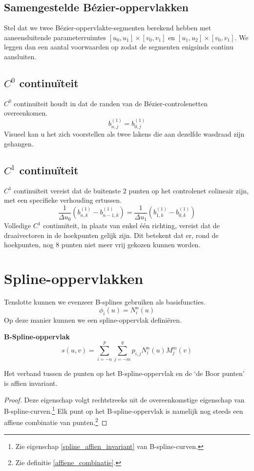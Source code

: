 \documentclass[computergesteund_ontwerp_van_curven_en_oppervlakken.tex]{subfiles}
\begin{document}
\subsection{Samengestelde B\'ezier-oppervlakken}
Stel dat we twee B\'ezier-oppervlakte-segmenten berekend hebben met aaneensluitende parameterruimtes $[u_0,u_1]\times[v_0,v_1]$ en $[u_1,u_2]\times[v_0,v_1]$. We leggen dan een aantal voorwaarden op zodat de segmenten enigsinds continu aansluiten.

\subsection*{$C^{0}$ continu\"iteit}
$C^{0}$ continu\"iteit houdt in dat de randen van de B\'ezier-controlenetten overeenkomen.
\[
b_{n,j}^{(1)} = b_{0,j}^{(1)}
\]
Visueel kan u het zich voorstellen als twee lakens die aan dezelfde wasdraad zijn gehangen.

\subsection*{$C^{1}$ continu\"iteit}
$C^{1}$ continu\"iteit vereist dat de buitenste $2$ punten op het controlenet colineair zijn, met een specifieke verhouding ertussen.
\[
\frac{1}{\Delta u_0}(b_{n,k}^{(1)}-b_{n-1,k}^{(1)}) = \frac{1}{\Delta u_1}(b_{1,k}^{(1)}-b_{0,k}^{(1)})
\]
Volledige $C^{1}$ continu\"iteit, in plaats van enkel \'e\'en richting, vereist dat de draaivectoren in de hoekpunten gelijk zijn. Dit betekent dat er, rond de hoekpunten, nog $8$ punten niet meer vrij gekozen kunnen worden.


\section{Spline-oppervlakken}
Tenslotte kunnen we evenzeer B-splines gebruiken als basisfuncties.
\[
\phi_{i}(u) = N_{i}^{n}(u)
\]
Op deze manier kunnen we een spline-oppervlak defini\"eren.
\begin{de}
\textbf{B-Spline-oppervlak}
\[
s(u,v) = \sum_{i=-n}^{p}\sum_{j=-m}^{q}p_{i,j}N_{i}^{n}(u)M_{j}^{m}(v)
\]
\end{de}
\begin{ei}
Het verband tussen de punten op het B-spline-oppervlak en de `de Boor punten' is affien invariant.
\begin{proof}
Deze eigenschap volgt rechtstreeks uit de overeenkomstige eigenschap van B-spline-curven.\footnote{Zie eigenschap \ref{spline_affien_invariant} van B-spline-curven.} Elk punt op het B-spline-oppervlak is namelijk nog steeds een affiene combinatie van punten.\footnote{Zie definitie \ref{affiene_combinatie}.}
\end{proof}
\end{ei}
\end{document}
